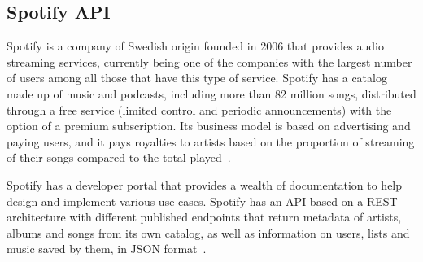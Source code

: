 \subsection{Spotify API}
\nonzeroparskip Spotify is a company of Swedish origin founded in 2006 that provides audio streaming services, currently being one of the companies with the largest number of users among all those that have this type of service. Spotify has a catalog made up of music and podcasts, including more than 82 million songs, distributed through a free service (limited control and periodic announcements) with the option of a premium subscription. Its business model is based on advertising and paying users, and it pays royalties to artists based on the proportion of streaming of their songs compared to the total played~\cite{wikipedia_spotify}.

\nonzeroparskip Spotify has a developer portal that provides a wealth of documentation to help design and implement various use cases. Spotify has an API based on a REST architecture with different published endpoints that return metadata of artists, albums and songs from its own catalog, as well as information on users, lists and music saved by them, in JSON format~\cite{spotify_dev}.

